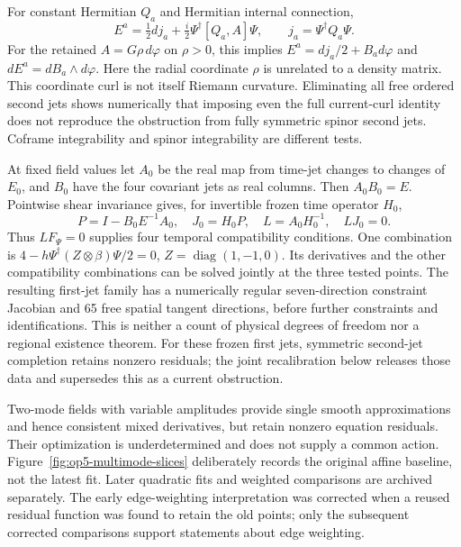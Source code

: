 For constant Hermitian \(Q_a\) and Hermitian internal connection,
\[
 E^a=\tfrac12dj_a+\tfrac i2\Psi^\dagger[Q_a,A]\Psi,
 \qquad j_a=\Psi^\dagger Q_a\Psi.
\]
For the retained \(A=G\rho\,d\varphi\) on \(\rho>0\), this implies
\(E^a=dj_a/2+B_a d\varphi\) and
\(dE^a=dB_a\wedge d\varphi\). Here the radial coordinate \(\rho\)
is unrelated to a density matrix. This coordinate curl is not itself
Riemann curvature. Eliminating all free ordered second jets shows
numerically that imposing even the full current-curl identity does not
reproduce the obstruction from fully symmetric spinor second jets.
Coframe integrability and spinor integrability are different tests.

At fixed field values let \(A_0\) be the real map from time-jet changes
to changes of \(E_0\), and \(B_0\) have the four covariant jets as real
columns. Then \(A_0B_0=E\). Pointwise shear invariance gives, for
invertible frozen time operator \(H_0\),
\[
 P=I-B_0E^{-1}A_0,\quad J_0=H_0P,\quad
 L=A_0H_0^{-1},\quad LJ_0=0.
\]
Thus \(LF_\Psi=0\) supplies four temporal compatibility conditions.
One combination is
\(4-h\Psi^\dagger(Z\otimes\beta)\Psi/2=0\),
\(Z=\operatorname{diag}(1,-1,0)\). Its derivatives and the other
compatibility combinations can be solved jointly at the three tested
points. The resulting first-jet family has a numerically regular
seven-direction constraint Jacobian and 65 free spatial tangent
directions, before further constraints and identifications. This is
neither a count of physical degrees of freedom nor a regional existence
theorem. For these frozen first jets, symmetric second-jet completion
retains nonzero residuals; the joint recalibration below releases those
data and supersedes this as a current obstruction.

Two-mode fields with variable amplitudes provide single smooth
approximations and hence consistent mixed derivatives, but retain
nonzero equation residuals. Their optimization is underdetermined and
does not supply a common action. Figure~\ref{fig:op5-multimode-slices}
deliberately records the original affine baseline, not the latest fit.
Later quadratic fits and weighted comparisons are archived separately.
The early edge-weighting interpretation was corrected when a reused
residual function was found to retain the old points; only the subsequent
corrected comparisons support statements about edge weighting.

